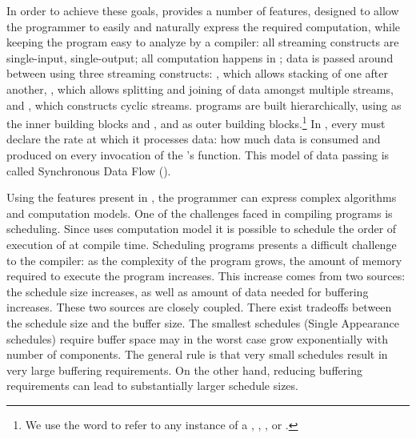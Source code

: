 In order to achieve these goals, {\StreamIt} provides a number of
features, designed to allow the programmer to easily and naturally
express the required computation, while keeping the program easy
to analyze by a compiler: all {\StreamIt} streaming constructs are
single-input, single-output; all computation happens in
{\filters}; data is passed around between {\filters} using three
streaming constructs: {\pipeline}, which allows stacking of
{\filters} one after another, {\splitjoin}, which allows splitting
and joining of data amongst multiple streams, and
{{\feedbackloop}}, which constructs cyclic streams. {\StreamIt}
programs are built hierarchically, using {\filters} as the inner
building blocks and {\pipelines}, {\splitjoins} and
{\feedbackloops} as outer building blocks.\footnote{We use the
word {\stream} to refer to any instance of a {\filter},
{\pipeline}, {\splitjoin}, or {\feedbackloop}.} In {\StreamIt},
every {\filter} must declare the rate at which it processes data:
how much data is consumed and produced on every invocation of the
{\filter}'s {\work} function. This model of data passing is called
Synchronous Data Flow ({\SDF}).

\begin{comment}
In addition to {\SDF}, {\StreamIt} allows the programmer to pass
data between {\filters} in an asynchronous manner, similar to a
combination of message passing and function calls. Timing of such
data delivery is expressed in terms of amount of information
wavefronts - the programmer can specify a delay between message
delivery and destination {\filter}'s processing of data currently
being produced or consumed by the source {\filter}.  Such timing
mechanism introduces latency and buffering constraints on
execution of {\StreamIt} programs.
\end{comment}

Using the features present in {\StreamIt}, the programmer can
express complex algorithms and computation models.  One of the
challenges faced in compiling {\StreamIt} programs is scheduling.
Since {\StreamIt} uses {\SDF} computation model it is possible to
schedule the order of execution of {\filters} at compile time.
Scheduling {\SDF} programs presents a difficult challenge to the
compiler:  as the complexity of the program grows, the amount of
memory required to execute the program increases.  This increase
comes from two sources: the schedule size increases, as well as
amount of data needed for buffering increases.  These two sources
are closely coupled. There exist tradeoffs between the schedule
size and the buffer size. The smallest schedules (Single
Appearance schedules) require buffer space may in the worst case
grow exponentially with number of components. The general rule is
that very small schedules result in very large buffering
requirements. On the other hand, reducing buffering requirements
can lead to substantially larger schedule sizes.

